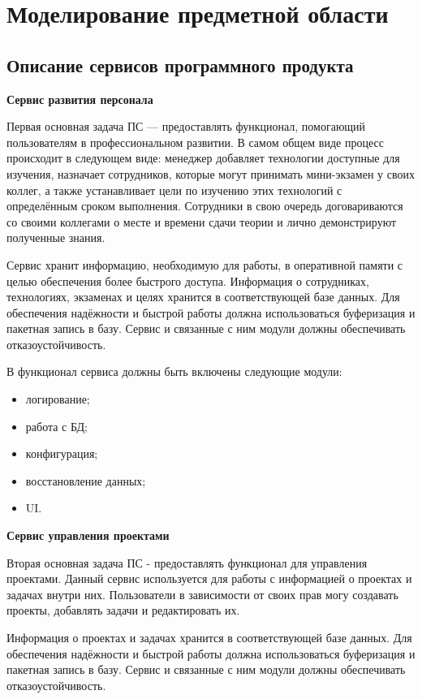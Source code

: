 \section{Моделирование предметной области}\label{sec:domain}

\subsection{Описание сервисов программного продукта}\label{sec:domain:service}

\textbf{Сервис развития персонала}

Первая основная задача ПС — предоставлять функционал, помогающий пользователям в профессиональном развитии. В самом общем виде процесс происходит в следующем виде: менеджер добавляет технологии доступные для изучения, назначает сотрудников, которые могут принимать мини-экзамен у своих коллег, а также устанавливает цели по изучению этих технологий с определённым сроком выполнения. Сотрудники в свою очередь договариваются со своими коллегами о месте и времени сдачи теории и лично демонстрируют полученные знания.

Сервис хранит информацию, необходимую для работы, в оперативной памяти с целью обеспечения более быстрого доступа. Информация о сотрудниках, технологиях, экзаменах и целях хранится в соответствующей базе данных. Для обеспечения надёжности и быстрой работы должна использоваться буферизация и пакетная запись в базу. Сервис и связанные с ним модули должны обеспечивать отказоустойчивость.

В функционал сервиса должны быть включены следующие модули:
\begin{itemize}
    \item логирование;
    \item работа с БД;
    \item конфигурация;
    \item восстановление данных;
    \item UI.
\end{itemize}

\bigskip
\textbf{Сервис управления проектами}

Вторая основная задача ПС - предоставлять функционал для управления проектами. Данный сервис используется для работы с информацией о проектах и задачах внутри них. Пользователи в зависимости от своих прав могу создавать проекты, добавлять задачи и редактировать их.

Информация о проектах и задачах хранится в соответствующей базе данных. Для обеспечения надёжности и быстрой работы должна использоваться буферизация и пакетная запись в базу. Сервис и связанные с ним модули должны обеспечивать отказоустойчивость.

